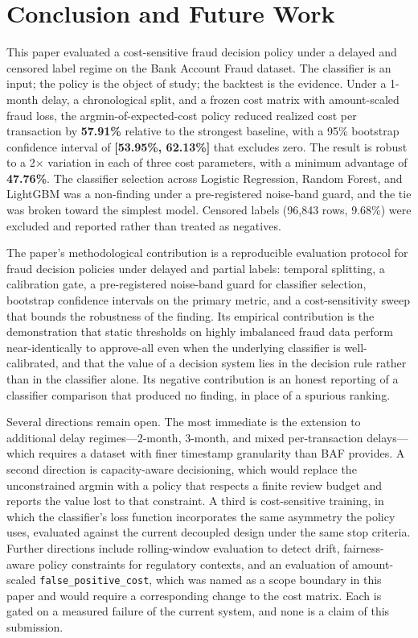 \documentclass[conference]{IEEEtran}
\begin{document}
\section{Conclusion and Future Work}

This paper evaluated a cost-sensitive fraud decision policy under a delayed
and censored label regime on the Bank Account Fraud dataset. The classifier
is an input; the policy is the object of study; the backtest is the
evidence. Under a 1-month delay, a chronological split, and a frozen cost
matrix with amount-scaled fraud loss, the argmin-of-expected-cost policy
reduced realized cost per transaction by \textbf{57.91\%} relative to the
strongest baseline, with a 95\% bootstrap confidence interval of
\textbf{[53.95\%, 62.13\%]} that excludes zero. The result is robust to a
2$\times$ variation in each of three cost parameters, with a minimum
advantage of \textbf{47.76\%}. The classifier selection across Logistic
Regression, Random Forest, and LightGBM was a non-finding under a
pre-registered noise-band guard, and the tie was broken toward the simplest
model. Censored labels (96,843 rows, 9.68\%) were excluded and reported
rather than treated as negatives.

The paper's methodological contribution is a reproducible evaluation
protocol for fraud decision policies under delayed and partial labels:
temporal splitting, a calibration gate, a pre-registered noise-band guard
for classifier selection, bootstrap confidence intervals on the primary
metric, and a cost-sensitivity sweep that bounds the robustness of the
finding. Its empirical contribution is the demonstration that static
thresholds on highly imbalanced fraud data perform near-identically to
approve-all even when the underlying classifier is well-calibrated, and
that the value of a decision system lies in the decision rule rather than
in the classifier alone. Its negative contribution is an honest reporting
of a classifier comparison that produced no finding, in place of a spurious
ranking.

Several directions remain open. The most immediate is the extension to
additional delay regimes---2-month, 3-month, and mixed per-transaction
delays---which requires a dataset with finer timestamp granularity than
BAF provides. A second direction is capacity-aware decisioning, which would
replace the unconstrained argmin with a policy that respects a finite
review budget and reports the value lost to that constraint. A third is
cost-sensitive training, in which the classifier's loss function
incorporates the same asymmetry the policy uses, evaluated against the
current decoupled design under the same stop criteria. Further directions
include rolling-window evaluation to detect drift, fairness-aware policy
constraints for regulatory contexts, and an evaluation of amount-scaled
\texttt{false\_positive\_cost}, which was named as a scope boundary in this
paper and would require a corresponding change to the cost matrix. Each is
gated on a measured failure of the current system, and none is a claim of
this submission.
\end{document}
